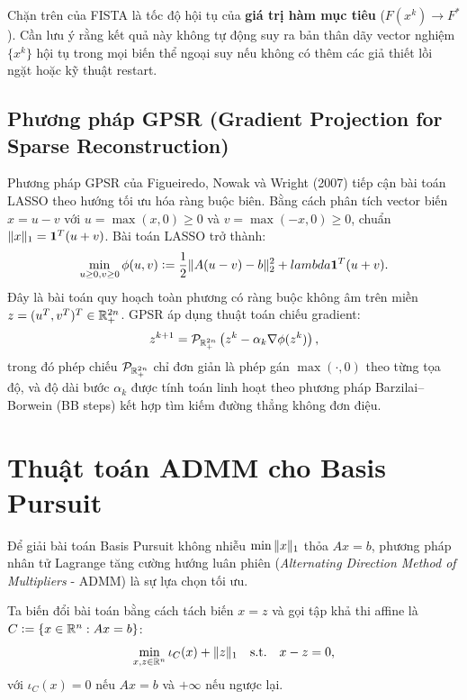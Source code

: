 \begin{remark}
Chặn trên của FISTA là tốc độ hội tụ của \textbf{giá trị hàm mục tiêu} ($F(x^k) \to F^*$). Cần lưu ý rằng kết quả này không tự động suy ra bản thân dãy vector nghiệm $\{x^k\}$ hội tụ trong mọi biến thể ngoại suy nếu không có thêm các giả thiết lồi ngặt hoặc kỹ thuật restart.
\end{remark}

\subsection{Phương pháp GPSR (Gradient Projection for Sparse Reconstruction)}
Phương pháp GPSR của Figueiredo, Nowak và Wright (2007) \cite{figueiredo2007gradient} tiếp cận bài toán LASSO theo hướng tối ưu hóa ràng buộc biên. Bằng cách phân tích vector biến $x = u - v$ với $u = \max(x, 0) \ge 0$ và $v = \max(-x, 0) \ge 0$, chuẩn $\|x\|_1 = \mathbf{1}^T(u + v)$. Bài toán LASSO trở thành:
\begin{equation}
    \min_{u \ge 0, v \ge 0} \phi(u, v) \mathrel{\mathop:}= \frac{1}{2} \|A(u - v) - b\|_2^2 + lambda \mathbf{1}^T(u + v).
\end{equation}
Đây là bài toán quy hoạch toàn phương có ràng buộc không âm trên miền $z = (u^T, v^T)^T \in \mathbb{R}^{2n}_+$. GPSR áp dụng thuật toán chiếu gradient:
\begin{equation}
    z^{k+1} = \mathcal{P}_{\mathbb{R}^{2n}_+} \left( z^k - \alpha_k \nabla \phi(z^k) \right),
\end{equation}
trong đó phép chiếu $\mathcal{P}_{\mathbb{R}^{2n}_+}$ chỉ đơn giản là phép gán $\max(\cdot, 0)$ theo từng tọa độ, và độ dài bước $\alpha_k$ được tính toán linh hoạt theo phương pháp Barzilai--Borwein (BB steps) kết hợp tìm kiếm đường thẳng không đơn điệu.

\section{Thuật toán ADMM cho Basis Pursuit}
Để giải bài toán Basis Pursuit không nhiễu $\min \|x\|_1$ thỏa $Ax = b$, phương pháp nhân tử Lagrange tăng cường hướng luân phiên (\emph{Alternating Direction Method of Multipliers} - ADMM) \cite{boyd2011distributed} là sự lựa chọn tối ưu.

Ta biến đổi bài toán bằng cách tách biến $x = z$ và gọi tập khả thi affine là $C \mathrel{\mathop:}= \{x \in \mathbb{R}^n : Ax = b\}$:
\begin{equation}
    \min_{x, z \in \mathbb{R}^n} \iota_C(x) + \|z\|_1 \quad \text{s.t.} \quad x - z = 0,
\end{equation}
với $\iota_C(x) = 0$ nếu $Ax = b$ và $+\infty$ nếu ngược lại.

